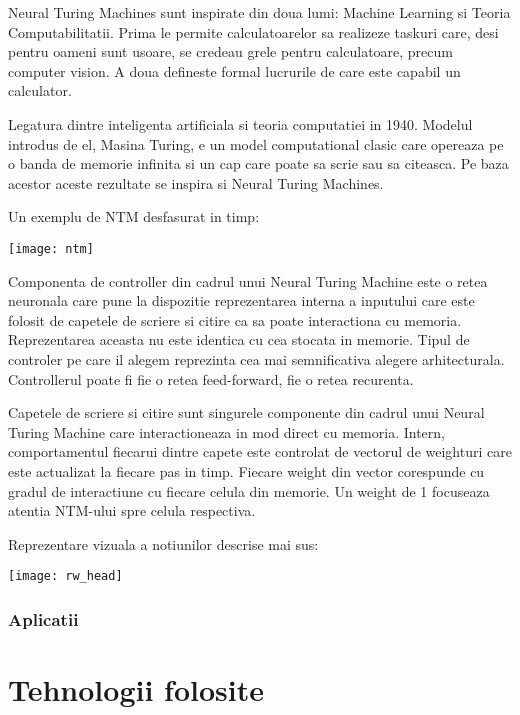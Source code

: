 \documentclass[12pt]{article}
\begin{document}
Neural Turing Machines sunt inspirate din doua lumi: Machine Learning si Teoria Computabilitatii. Prima le permite calculatoarelor sa realizeze taskuri care, desi pentru oameni sunt usoare, se credeau grele pentru calculatoare, precum computer vision. A doua defineste formal lucrurile de care este capabil un calculator. 

Legatura dintre inteligenta artificiala si teoria computatiei in 1940. Modelul introdus de el, Masina Turing, e un model computational clasic care opereaza pe o banda de memorie infinita si un cap care poate sa scrie sau sa citeasca. Pe baza acestor aceste rezultate se inspira si Neural Turing Machines.

Un exemplu de NTM desfasurat in timp:

\begin{center}
\texttt{[image: ntm]}
\end{center}

Componenta de controller din cadrul unui Neural Turing Machine este o retea neuronala care pune la dispozitie reprezentarea interna a inputului care este folosit de capetele de scriere si citire ca sa poate interactiona cu memoria. Reprezentarea aceasta nu este identica cu cea stocata in memorie. Tipul de controler pe care il alegem reprezinta cea mai semnificativa alegere arhitecturala. Controllerul poate fi fie o retea feed-forward, fie o retea recurenta.

Capetele de scriere si citire sunt singurele componente din cadrul unui Neural Turing Machine care interactioneaza in mod direct cu memoria. Intern, comportamentul fiecarui dintre capete este controlat de vectorul de weighturi care este actualizat la fiecare pas in timp. Fiecare weight din vector corespunde cu gradul de interactiune cu fiecare celula din memorie. Un weight de 1 focuseaza atentia NTM-ului spre celula respectiva.

Reprezentare vizuala a notiunilor descrise mai sus:

\begin{center}
\texttt{[image: rw\_head]}
\end{center}

\subsubsection{Aplicatii}

\section{Tehnologii folosite}
\end{document}
